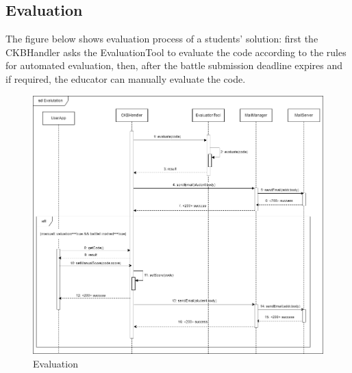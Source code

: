 \subsection{Evaluation}
The figure below shows evaluation process of a students' solution: first the CKBHandler asks the EvaluationTool to evaluate the 
code according to the rules for automated evaluation, then, after the battle submission deadline expires and if required, the 
educator can manually evaluate the code.\\
\begin{figure}[H]
    \centering
    \includegraphics[width=1\textwidth]{images/seq_diagrams/evaluation_DD.png}
    \caption{Evaluation}
\end{figure}

